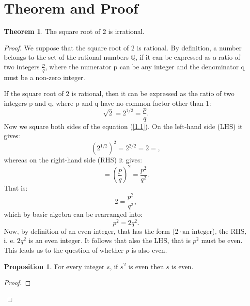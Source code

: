 \documentclass[11pt]{amsart}
\theoremstyle{definition}
\newtheorem{theorem}{Theorem}
\newtheorem{proposition}{Proposition}
\begin{document}
\section{Theorem and Proof}
\begin{theorem}
    The square root of 2 is irrational.
\end{theorem}
\begin{proof}
    We suppose that the square root of \(2\) is rational.
    By definition, a number belongs to the set of the rational numbers \(\mathbb{Q}\), if it can be expressed as a ratio of two integers  \(\frac{p}{q}\), where the numerator p can be any integer and the denominator q must be a non-zero integer.

    If the square root of \(2\) is rational, then it can be expressed as the ratio of two integers p and q, where p and q have no common factor other than \(1\):
    \begin{equation}\label{1.1}
        \sqrt{2} = 2^{1/2} = \frac{p}{q}.
    \end{equation}
    Now we square both sides of the equation (\ref{1.1}). On the left-hand side (LHS) it gives:
    \begin{equation}\label{1.2}
        \left(2^{1/2}\right)^{2} = 2^{2/2} = 2 =,
    \end{equation}
    whereas on the right-hand side (RHS) it gives:
    \begin{equation}\label{1.3}
        = \left(\frac{p}{q}\right)^{2} = \frac{p^2}{q^2}.
    \end{equation}
    That is:
    \begin{equation}\label{1.4}
        2 = \frac{p^2}{q^2},
    \end{equation}
    which by basic algebra can be rearranged into:
    \begin{equation}\label{1.5}
        p^{2} = 2q^{2}.
    \end{equation}
    Now, by definition of an even integer, that has the form \((2 \cdot \text{an integer}\)), the RHS, i. e. \(2q^{2}\) is an even integer. It follows that also the LHS, that is \(p^{2}\) must be even. This leads us to the question of whether \(p\) is also even.
    \begin{proposition}\label{2.1}
        For every integer \(s\), if \(s^{2}\) is even then \(s\) is even.
    \end{proposition}
    \begin{proof}

\end{proof}
\end{proof}
\end{document}
